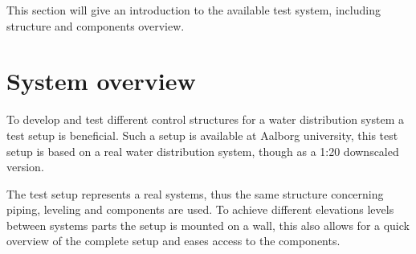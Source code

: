 This section will give an introduction to the available test system, including structure and components overview.  

\section{System overview}
To develop and test different control structures for a water distribution system a test setup is beneficial.
Such a setup is available at Aalborg university, this test setup is based on a real water distribution system, though as a 1:20 downscaled version.

The test setup represents a real systems, thus the same structure concerning piping, leveling and components are used. To achieve different elevations levels between systems parts the setup is mounted on a wall, this also allows for a quick overview of the complete setup and eases access to the components.    

